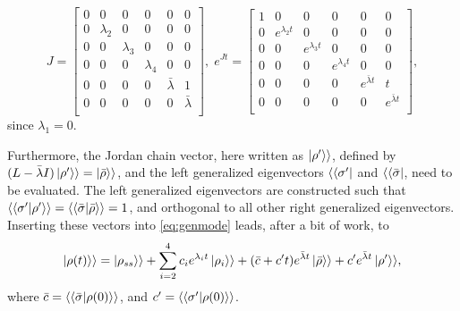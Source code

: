 \documentclass[../main.tex]{subfiles}
\begin{document}
\begin{equation}
    J = \begin{bmatrix} 0 & 0 & 0 & 0 & 0 & 0 \\
                        0 & \lambda_2 & 0 & 0 & 0 & 0 \\
                        0 & 0 & \lambda_3 & 0 & 0 & 0 \\
                        0 & 0 & 0 & \lambda_4 & 0 & 0 \\
                        0 & 0 & 0 & 0 & \bar \lambda & 1 \\
                        0 & 0 & 0 & 0 & 0 & \bar \lambda \\ \end{bmatrix}, \; 
        e^{Jt} = \begin{bmatrix} 1 & 0 & 0 & 0 & 0 & 0 \\
            0 & e^{\lambda_2t} & 0 & 0 & 0 & 0 \\
            0 & 0 & e^{\lambda_3t} & 0 & 0 & 0 \\
            0 & 0 & 0 & e^{\lambda_4t} & 0 & 0 \\
            0 & 0 & 0 & 0 & e^{\bar \lambda t} & t \\
        0 & 0 & 0 & 0 & 0 & e^{\bar \lambda t} \\ \end{bmatrix},
\end{equation}
since $\lambda_1 = 0$.

Furthermore, the Jordan chain vector, here written as $\ket{\rho'}\rangle$, defined by\\${(L - \bar\lambda I)\ket{\rho'}\rangle = \ket{\bar\rho}\rangle}$, and the left generalized eigenvectors $\langle\bra{\sigma'}$ and $\langle\bra{\bar\sigma}$, need to be evaluated. The left generalized eigenvectors are constructed such that $\langle\braket{\sigma'|\rho'}\rangle = \langle\braket{\bar\sigma|\bar\rho}\rangle = 1$, and orthogonal to all other right generalized eigenvectors. Inserting these vectors into \cref{eq:genmode} leads, after a bit of work, to
\begin{equation}\label{eq:dynep}
    \begin{aligned}
        \ket{\rho(t)}\rangle = \ket{\rho_{ss}}\rangle + \sum_{i=2}^4 c_i e^{\lambda_i t} \ket{\rho_i}\rangle  
                                + (\bar c + c't)e^{\bar \lambda t}\ket{\bar \rho}\rangle + c'e^{\bar\lambda t}\ket{\rho'}\rangle,
    \end{aligned}
\end{equation}
where $\bar c = \langle\braket{\bar\sigma|\rho(0)}\rangle$, and $c' = \langle\braket{\sigma'|\rho(0)}\rangle$.
\end{document}
